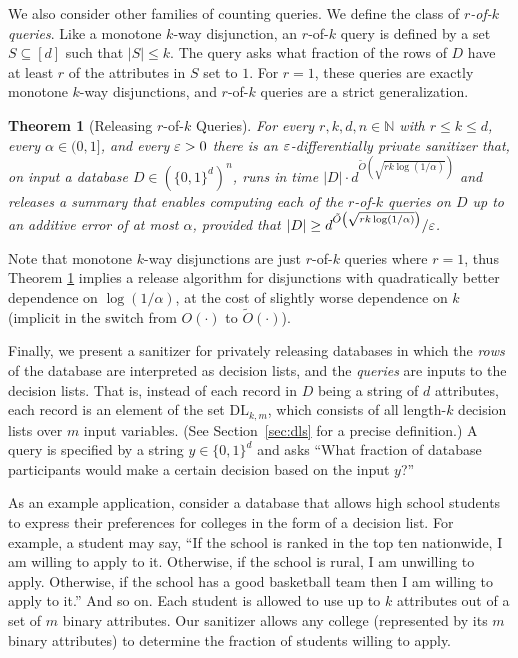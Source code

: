 \documentclass[11pt]{article}
\newcommand\N{\mathbb{N}}
\newcommand\bits{\{0,1\}}
\newtheorem{theorem}{Theorem}[section]
\theoremstyle{definition}
\begin{document}
We also consider other families of counting queries.  We define the class of \emph{$r$-of-$k$ queries}.  Like a monotone $k$-way disjunction, an $r$-of-$k$ query is defined by a set $S \subseteq [d]$ such that $|S| \leq k$.  The query asks what fraction of the rows of $D$ have at least $r$ of the attributes in $S$ set to $1$.  For $r=1$, these queries are exactly monotone $k$-way disjunctions, and $r$-of-$k$ queries are a strict generalization.

\begin{theorem}[Releasing $r$-of-$k$ Queries] \label{thm:main2}
For every $r,k,d, n \in \N$ with $r \leq k \leq d$, every $\alpha \in (0,1]$, and every $\varepsilon > 0$ there is an $\varepsilon$-differentially private sanitizer that, on input a database $D \in (\bits^d)^n$, runs in time $|D| \cdot d^{\tilde{O}\left(\sqrt{rk \log(1/\alpha)}\right)}$ and releases a summary that enables computing each of the $r$-of-$k$ queries on $D$ up to an additive error of at most $\alpha$, provided that $|D| \geq d^{\tilde{O}\left(\sqrt{rk \log(1/\alpha)}\right)}/\varepsilon$.
\end{theorem}
Note that monotone $k$-way disjunctions are just $r$-of-$k$ queries where $r=1$, thus Theorem \ref{thm:main2} 
implies a release algorithm for disjunctions with
quadratically better dependence on $\log(1/\alpha)$, at the cost of slightly worse dependence on $k$ (implicit in the switch from $O(\cdot)$ to $\tilde{O}(\cdot)$).

Finally, we present a sanitizer for privately releasing databases in which
the \emph{rows} of the database are interpreted as decision lists, and the \emph{queries} are inputs to the
decision lists. That is, instead of each record in $D$ being a string of $d$ attributes, each record is an element of the set $\mathrm{DL}_{k,m}$, which consists of all length-$k$ decision lists over $m$ input variables. (See Section~\ref{sec:dls} for a precise definition.) A query is specified by a string $y \in \bits^d$ and asks ``What fraction of database participants would make a certain decision based on the input $y$?''

As an example application, consider a database that allows high school students to
express their preferences for colleges in the form of a decision list.
For example, a student may say, ``If the school is ranked in the top
ten nationwide, I am willing to apply to it. Otherwise, if the school is 
rural, I am unwilling to apply. Otherwise, if the school has a good
basketball team then I am willing to apply to it.'' And so on. Each student is allowed to use up to $k$ attributes out of a set of $m$ binary attributes.  Our sanitizer allows any college (represented by its $m$ binary attributes) to determine the fraction of students willing to apply. 
\end{document}
